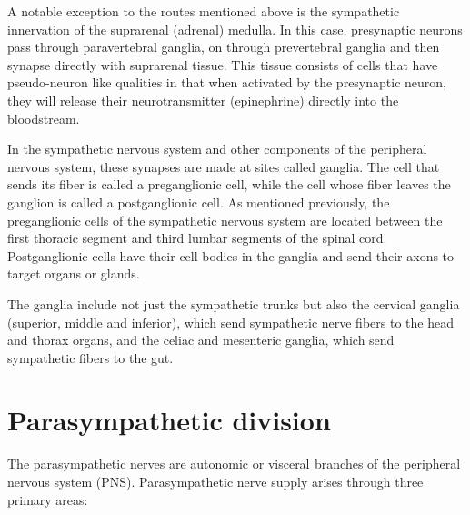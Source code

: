 \documentclass[]{book}
\begin{document}
A notable exception to the routes mentioned above is the sympathetic innervation of the suprarenal (adrenal) medulla. In this case, presynaptic neurons pass through paravertebral ganglia, on through prevertebral ganglia and then synapse directly with suprarenal tissue. This tissue consists of cells that have pseudo-neuron like qualities in that when activated by the presynaptic neuron, they will release their neurotransmitter (epinephrine) directly into the bloodstream.

In the sympathetic nervous system and other components of the peripheral nervous system, these synapses are made at sites called ganglia. The cell that sends its fiber is called a preganglionic cell, while the cell whose fiber leaves the ganglion is called a postganglionic cell. As mentioned previously, the preganglionic cells of the sympathetic nervous system are located between the first thoracic segment and third lumbar segments of the spinal cord. Postganglionic cells have their cell bodies in the ganglia and send their axons to target organs or glands.

The ganglia include not just the sympathetic trunks but also the cervical ganglia (superior, middle and inferior), which send sympathetic nerve fibers to the head and thorax organs, and the celiac and mesenteric ganglia, which send sympathetic fibers to the gut.

\hypertarget{parasympathetic-division}{%
\section{Parasympathetic division}\label{parasympathetic-division}}

The parasympathetic nerves are autonomic or visceral  branches of the peripheral nervous system (PNS). Parasympathetic nerve supply arises through three primary areas:
\end{document}
